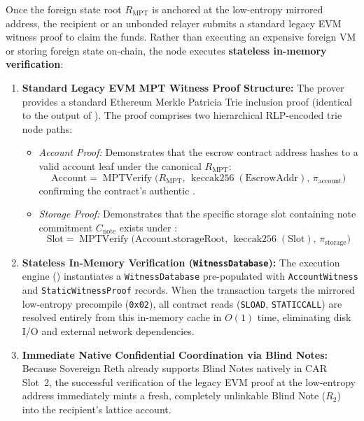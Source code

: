 \documentclass[a4paper,11pt,twoside,parskip=half-,headings=small]{scrartcl}
\newcommand{\code}[1]{\texttt{#1}}
\begin{document}
Once the foreign state root $R_{\text{MPT}}$ is anchored at the low-entropy mirrored address, the recipient or an unbonded relayer submits a standard legacy EVM witness proof to claim the funds. Rather than executing an expensive foreign VM or storing foreign state on-chain, the node executes \textbf{stateless in-memory verification}:
\begin{enumerate}[nosep]
  \item \textbf{Standard Legacy EVM MPT Witness Proof Structure:}
  The prover provides a standard Ethereum Merkle Patricia Trie inclusion proof (identical to the output of ). The proof comprises two hierarchical RLP-encoded trie node paths:
  \begin{itemize}[nosep]
    \item \emph{Account Proof:} Demonstrates that the escrow contract address hashes to a valid account leaf under the canonical $R_{\text{MPT}}$:
    \begin{equation}
      \text{Account} = \operatorname{MPTVerify}\bigl(R_{\text{MPT}},\, \operatorname{keccak256}(\text{EscrowAddr}),\, \pi_{\text{account}}\bigr)
    \end{equation}
    confirming the contract's authentic .
    \item \emph{Storage Proof:} Demonstrates that the specific storage slot containing note commitment $C_{\text{note}}$ exists under :
    \begin{equation}
      \text{Slot} = \operatorname{MPTVerify}\bigl(\text{Account}.\text{storageRoot},\, \operatorname{keccak256}(\text{Slot}),\, \pi_{\text{storage}}\bigr)
    \end{equation}
  \end{itemize}

  \item \textbf{Stateless In-Memory Verification (\code{WitnessDatabase}):}
  The execution engine () instantiates a \code{WitnessDatabase} pre-populated with \code{AccountWitness} and \code{StaticWitnessProof} records. When the transaction targets the mirrored low-entropy precompile (\code{0x02}), all contract reads (\code{SLOAD}, \code{STATICCALL}) are resolved entirely from this in-memory cache in $O(1)$ time, eliminating disk I/O and external network dependencies.

  \item \textbf{Immediate Native Confidential Coordination via Blind Notes:}
  Because Sovereign Reth already supports Blind Notes natively in CAR Slot~2, the successful verification of the legacy EVM proof at the low-entropy address immediately mints a fresh, completely unlinkable Blind Note ($R_2$) into the recipient's lattice account.
  

\end{enumerate}
\end{document}
